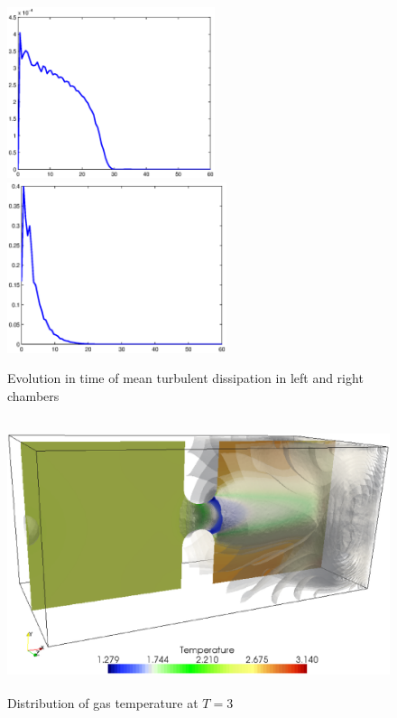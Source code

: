 \begin{figure}[bhpt]
\centerline{
\includegraphics[height=5.0cm]
{chapters/hoffman-3/eps/tur_disp_l.eps}
\includegraphics[height=5.0cm]
{chapters/hoffman-3/eps/tur_disp_r.eps}
}
\caption{Evolution in time of mean turbulent dissipation in left and right
chambers}
\label{tur_disipation}
\end{figure}



\begin{figure}[bhpt]
\centerline{
\includegraphics[height=8.0cm]
{chapters/hoffman-3/eps/Tem_T_3.eps}
}
\caption{Distribution of gas temperature at $T=3$}
\label{temp3}
\end{figure}


